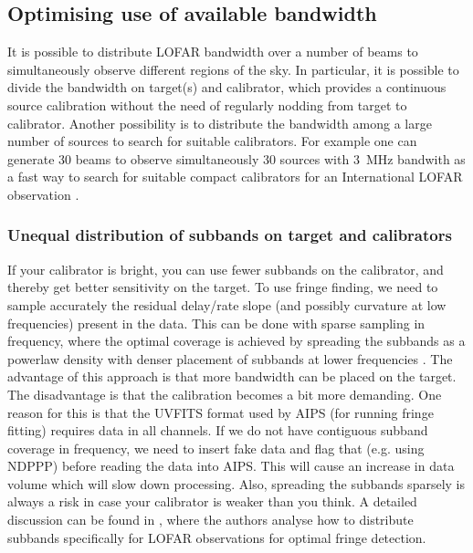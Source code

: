 \documentclass[graybox]{svmult}
\begin{document}
\subsection{Optimising use of available bandwidth}\label{sec:bandwidth}
It is possible to distribute LOFAR bandwidth over a number of beams to
simultaneously observe different regions of the sky. In particular, it is
possible to divide the bandwidth on target(s) and calibrator, which provides a
continuous source calibration without the need of regularly nodding from target
to calibrator. Another possibility is to distribute the bandwidth among a large
number of sources to search for suitable calibrators. For example one can
generate 30 beams to observe simultaneously 30 sources with 3~MHz bandwith as a
fast way to search for suitable compact calibrators for an
International LOFAR observation \citep[see i.e.][]{moldon15}. 

\subsubsection{Unequal distribution of subbands on target and calibrators} 
If your calibrator is bright, you can use fewer subbands on the calibrator, and
thereby get better sensitivity on the target. To use fringe finding, we need to
sample accurately the residual delay/rate slope (and possibly curvature at low
frequencies) present in the data. This can be done with sparse sampling in
frequency, where the optimal coverage is achieved by spreading the subbands as
a powerlaw density with denser placement of subbands at lower frequencies
\citep{marti-vidal10}. The advantage of this approach is that more bandwidth
can be placed on the target.  The disadvantage is that the calibration becomes
a bit more demanding. One reason for this is that the UVFITS format used by
AIPS (for running fringe fitting) requires data in all channels.  If we do not
have contiguous subband coverage in frequency, we need to insert fake data and
flag that (e.g. using NDPPP) before reading the data into AIPS.  This will
cause an increase in data volume which will slow down processing.  Also,
spreading the subbands sparsely is always a risk in case your calibrator is
weaker than you think. A detailed discussion can be found in
\cite{marti-vidal10}, where the authors analyse how to distribute subbands
specifically for LOFAR observations for optimal fringe detection.
\end{document}
